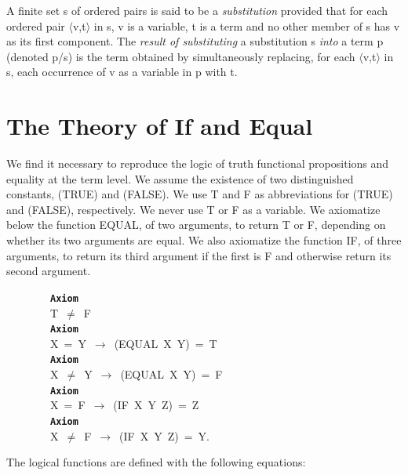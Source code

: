 \documentclass[11pt]{book}
\newenvironment{pubasis}{\begin{flushleft}\ttfamily\small}{\normalsize\rmfamily\end{flushleft}}
\newcommand{\axiomordefinition}[1]{\vspace{6pt}\texttt{\textbf{#1}}}
\newcommand{\pubinlineunderline}[1]{\emph{#1}}
\newcommand{\pubdefaulttextsize}{\large}
\begin{document}
A finite set s of ordered pairs is said to be a \pubinlineunderline{substitution}
provided that for each ordered pair $\langle$v,t$\rangle$ in s, v is a variable, t is
a term and no other member of s has v as its first component.
The \pubinlineunderline{result of substituting} a substitution s \pubinlineunderline{into} a term p
(denoted p/s) is the term obtained by simultaneously replacing, for
each $\langle$v,t$\rangle$ in s, each occurrence of v as a variable in p with t.
\nopagebreak\par\hrulefill\nopagebreak\par
\section{The Theory of If and Equal}
\pubdefaulttextsize
\par\pagebreak[0]\hrulefill\nopagebreak\par
We find it necessary to reproduce the logic
of truth functional propositions and equality at the term level.  We
assume the existence of two distinguished constants, (TRUE) and (FALSE).  We
use T and F as abbreviations for (TRUE) and (FALSE), respectively.
We  never use T or F as a variable.
We axiomatize below the function EQUAL, of two arguments,
to return T or F, depending on whether its two
arguments are equal.
We also axiomatize the function IF, of three arguments, to return
its third argument if the first is F and otherwise return its second
argument.
\begin{pubasis}
~~~~~~~~\axiomordefinition{Axiom}\\
~~~~~~~~T~$\neq$~F\\

~~~~~~~~\axiomordefinition{Axiom}\\
~~~~~~~~X~=~Y~$\rightarrow$~(EQUAL~X~Y)~=~T\\

~~~~~~~~\axiomordefinition{Axiom}\\
~~~~~~~~X~$\neq$~Y~$\rightarrow$~(EQUAL~X~Y)~=~F\\

~~~~~~~~\axiomordefinition{Axiom}\\
~~~~~~~~X~=~F~$\rightarrow$~(IF~X~Y~Z)~=~Z\\

~~~~~~~~\axiomordefinition{Axiom}\\
~~~~~~~~X~$\neq$~F~$\rightarrow$~(IF~X~Y~Z)~=~Y.\\
\end{pubasis}
The logical functions
are defined with the following  equations:
\end{document}
